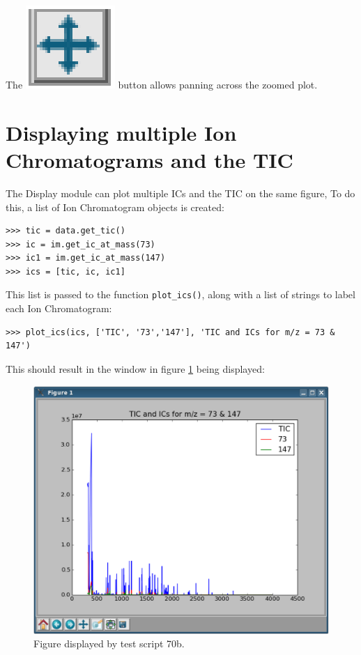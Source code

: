 The 
\includegraphics[scale=0.5]{graphics/chapter07/cross_button.eps}
button allows panning across the zoomed plot. 


\section{Displaying multiple Ion Chromatograms and the TIC}



The Display module can plot multiple ICs and the TIC on the same figure, 
To do this, a list of Ion Chromatogram objects is created:

\begin{verbatim}
>>> tic = data.get_tic()
>>> ic = im.get_ic_at_mass(73)
>>> ic1 = im.get_ic_at_mass(147)
>>> ics = [tic, ic, ic1]
\end{verbatim}

This list is passed to the 
function {\tt plot\_ics()}, along with a list of strings to label each 
Ion Chromatogram:

\begin{verbatim}
>>> plot_ics(ics, ['TIC', '73','147'], 'TIC and ICs for m/z = 73 & 147')
\end{verbatim}

This should result in the window in figure \ref{70b} being displayed:

\begin{figure}
  \begin{center}
    \includegraphics[scale=0.33]{graphics/chapter07/test-70b.eps}
  \end{center}
  \caption{Figure displayed by test script 70b.}
  \label{70b}
\end{figure}

